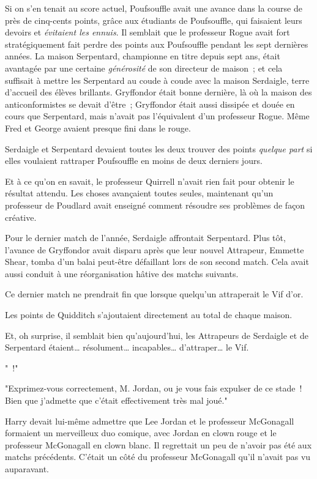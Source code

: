 Si on s'en tenait au score actuel, Poufsouffle avait une avance dans la course de près de cinq-cents points, grâce aux étudiants de Poufsouffle, qui faisaient leurs devoirs et \emph{évitaient les ennuis}. Il semblait que le professeur Rogue avait fort stratégiquement fait perdre des points aux Poufsouffle pendant les sept dernières années. La maison Serpentard, championne en titre depuis sept ans, était avantagée par une certaine \emph{générosité} de son directeur de maison~; et cela suffisait à mettre les Serpentard au coude à coude avec la maison Serdaigle, terre d'accueil des élèves brillants. Gryffondor était bonne dernière, là où la maison des anticonformistes se devait d'être~; Gryffondor était aussi dissipée et douée en cours que Serpentard, mais n'avait pas l'équivalent d'un professeur Rogue. Même Fred et George avaient presque fini dans le rouge.

Serdaigle et Serpentard devaient toutes les deux trouver des points \emph{quelque part} si elles voulaient rattraper Poufsouffle en moins de deux derniers jours.

Et à ce qu'on en savait, le professeur Quirrell n'avait rien fait pour obtenir le résultat attendu. Les choses avançaient toutes seules, maintenant qu'un professeur de Poudlard avait enseigné comment résoudre ses problèmes de façon créative.

Pour le dernier match de l'année, Serdaigle affrontait Serpentard. Plus tôt, l'avance de Gryffondor avait disparu après que leur nouvel Attrapeur, Emmette Shear, tomba d'un balai peut-être défaillant lors de son second match. Cela avait aussi conduit à une réorganisation hâtive des matchs suivants.

Ce dernier match ne prendrait fin que lorsque quelqu'un attraperait le Vif d'or.

Les points de Quidditch s'ajoutaient directement au total de chaque maison.

Et, oh surprise, il semblait bien qu'aujourd'hui, les Attrapeurs de Serdaigle et de Serpentard étaient… résolument… incapables… d'attraper… le Vif.

"~!"

"Exprimez-vous correctement, M. Jordan, ou je vous fais expulser de ce stade~! Bien que j'admette que c'était effectivement très mal joué."

Harry devait lui-même admettre que Lee Jordan et le professeur McGonagall formaient un merveilleux duo comique, avec Jordan en clown rouge et le professeur McGonagall en clown blanc. Il regrettait un peu de n'avoir pas été aux matchs précédents. C'était un côté du professeur McGonagall qu'il n'avait pas vu auparavant.

